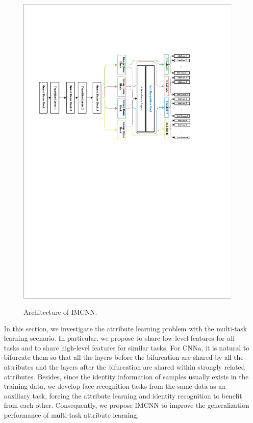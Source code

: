 \documentclass[wcp]{jmlr}
\begin{document}
	\begin{figure}[htb]
		\begin{center}
			\centering\includegraphics[width=16cm]{new_imgs/DenseNet.pdf}
			\label{fig:long}
		\end{center}
		\caption{Architecture of IMCNN.}
		\label{IMCNN_Arch}
	\end{figure}
	
	In this section, we investigate the attribute learning problem with the multi-task learning scenario. In particular, we propose to share low-level features for all tasks and to share high-level features for similar tasks. For CNNa, it is natural to bifurcate them so that all the layers before the bifurcation are shared by all the attributes and the layers after the bifurcation are shared within strongly related attributes. Besides, since the identity information of samples usually exists in the training data, we develop face recognition tasks from the same data as an auxiliary task, forcing the attribute learning and identity recognition to benefit from each other. Consequently, we propose IMCNN to improve the generalization performance of multi-task attribute learning.
	
\end{document}
